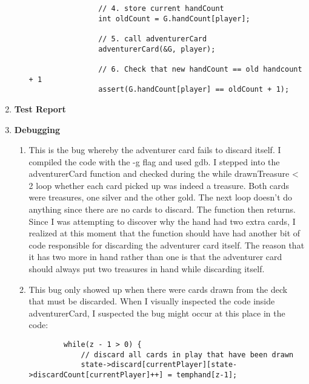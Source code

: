 \documentclass[11pt,letterpaper]{article}
\begin{document}
\begin{enumerate}[label=\Roman*.]
\begin{itemize}
\begin{lstlisting}
                // 4. store current handCount
                int oldCount = G.handCount[player];

                // 5. call adventurerCard
                adventurerCard(&G, player);

                // 6. Check that new handCount == old handcount + 1
                assert(G.handCount[player] == oldCount + 1);
              \end{lstlisting}

  
  
      \end{itemize}

  \item \textbf{Test Report}
  \item \textbf{Debugging}
    \begin{enumerate}[label=\arabic*]
      \item This is the bug whereby the adventurer card
        fails to discard itself. 
        I compiled the code with the -g flag and used gdb. 
        I stepped into the adventurerCard function and checked during the 
        while drawnTreasure < 2 loop whether each card picked up was indeed
        a treasure. Both cards were treasures, one silver and the other gold.
        The next loop doesn't do anything since there are no cards to discard. 
        The function
        then returns. Since I was attempting to discover why the hand had 
        two extra cards, I realized at this moment that the function should have
        had another bit of code responsible for discarding the adventurer
        card itself. The reason that it has two more in hand rather than one
        is that the adventurer card should always put two treasures in hand
        while discarding itself. 

      \item This bug only showed up when there were cards drawn from the deck
        that must be discarded. When I visually inspected the code inside
        adventurerCard, I suspected the bug might occur at this place in the 
        code: 
        \begin{lstlisting}
        while(z - 1 > 0) {
            // discard all cards in play that have been drawn
            state->discard[currentPlayer][state->discardCount[currentPlayer]++] = temphand[z-1]; 


\end{lstlisting}
\end{enumerate}
\end{enumerate}
\end{document}
